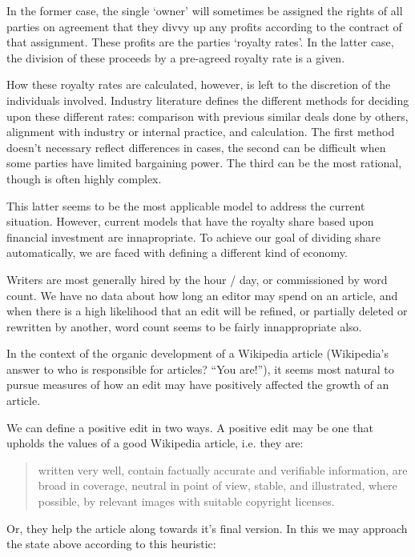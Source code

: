 In the former case, the single `owner' will sometimes be assigned the
rights of all parties on agreement that they divvy up any profits
according to the contract of that assignment. These profits are the
parties `royalty rates'. In the latter case, the division of these
proceeds by a pre-agreed royalty rate is a given.

How these royalty rates are calculated, however, is left to the
discretion of the individuals involved. Industry literature defines
the different methods for deciding upon these different rates:
comparison with previous similar deals done by others, alignment with
industry or internal practice, and calculation. The first method
doesn't necessary reflect differences in cases, the second can be
difficult when some parties have limited bargaining power. The third
can be the most rational, though is often highly
complex.\cite{simplemethod}

This latter seems to be the most applicable model to address the
current situation. However, current models that have the royalty share
based upon financial investment are innapropriate.\cite{simplemethod}
To achieve our goal of dividing share automatically, we are faced with
defining a different kind of economy.

Writers are most generally hired by the hour / day, or commissioned by
word count.\cite{copywriter-rates} We have no data about how long an
editor may spend on an article, and when there is a high likelihood
that an edit will be refined, or partially deleted or rewritten by
another, word count seems to be fairly innappropriate also.

In the context of the organic development of a Wikipedia article
(Wikipedia's answer to who is responsible for articles? ``You
are!''\cite{wiki-you-are}), it seems most natural to pursue measures
of how an edit may have positively affected the growth of an
article.

We can define a positive edit in two ways. A positive edit may
be one that upholds the values of a good Wikipedia article, i.e. they
are:

\begin{quote}
  written very well, contain factually accurate and verifiable
  information, are broad in coverage, neutral in point of view,
  stable, and illustrated, where possible, by relevant images with
  suitable copyright licenses.\cite{wiki-good}
\end{quote}

Or, they help the article along towards it's final version. In this we
may approach the state above according to this heuristic:

